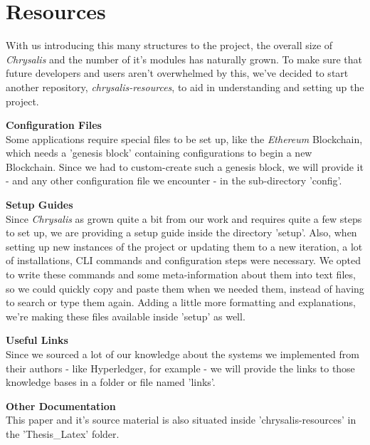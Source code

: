 %
\chapter{Resources}
\label{sec:res}

With us introducing this many structures to the project, the overall size of \emph{Chrysalis} and the number of it's modules has naturally grown. To make sure that future developers and users aren't overwhelmed by this, we've decided to start another repository, \emph{chrysalis-resources}, to aid in understanding and setting up the project.

\textbf{Configuration Files} \\[0.2em]
Some applications require special files to be set up, like the \emph{Ethereum} Blockchain, which needs a 'genesis block' containing configurations to begin a new Blockchain. Since we had to custom-create such a genesis block, we will provide it - and any other configuration file we encounter - in the sub-directory 'config'.

\textbf{Setup Guides} \\[0.2em]
Since \emph{Chrysalis} as grown quite a bit from our work and requires quite a few steps to set up, we are providing a setup guide inside the directory 'setup'. \newline
Also, when setting up new instances of the project or updating them to a new iteration, a lot of installations, CLI commands and configuration steps were necessary. We opted to write these commands and some meta-information about them into text files, so we could quickly copy and paste them when we needed them, instead of having to search or type them again. Adding a little more formatting and explanations, we're making these files available inside 'setup' as well.

\textbf{Useful Links} \\[0.2em]
Since we sourced a lot of our knowledge about the systems we implemented from their authors - like Hyperledger, for example - we will provide the links to those knowledge bases in a folder or file named 'links'.

\textbf{Other Documentation} \\[0.2em]
This paper and it's source material is also situated inside 'chrysalis-resources' in the 'Thesis\_Latex' folder.


